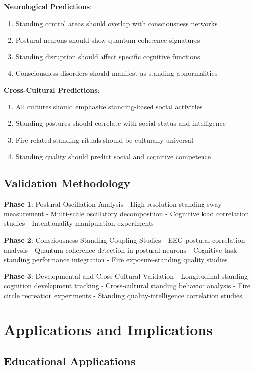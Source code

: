 \documentclass[12pt]{article}
\begin{document}
\textbf{Neurological Predictions}:
\begin{enumerate}
\item Standing control areas should overlap with consciousness networks
\item Postural neurons should show quantum coherence signatures
\item Standing disruption should affect specific cognitive functions
\item Consciousness disorders should manifest as standing abnormalities
\end{enumerate}

\textbf{Cross-Cultural Predictions}:
\begin{enumerate}
\item All cultures should emphasize standing-based social activities
\item Standing postures should correlate with social status and intelligence
\item Fire-related standing rituals should be culturally universal
\item Standing quality should predict social and cognitive competence
\end{enumerate}

\subsection{Validation Methodology}

\textbf{Phase 1}: Postural Oscillation Analysis
- High-resolution standing sway measurement
- Multi-scale oscillatory decomposition
- Cognitive load correlation studies
- Intentionality manipulation experiments

\textbf{Phase 2}: Consciousness-Standing Coupling Studies
- EEG-postural correlation analysis
- Quantum coherence detection in postural neurons
- Cognitive task-standing performance integration
- Fire exposure-standing quality studies

\textbf{Phase 3}: Developmental and Cross-Cultural Validation
- Longitudinal standing-cognition development tracking
- Cross-cultural standing behavior analysis
- Fire circle recreation experiments
- Standing quality-intelligence correlation studies

\section{Applications and Implications}

\subsection{Educational Applications}
\end{document}
